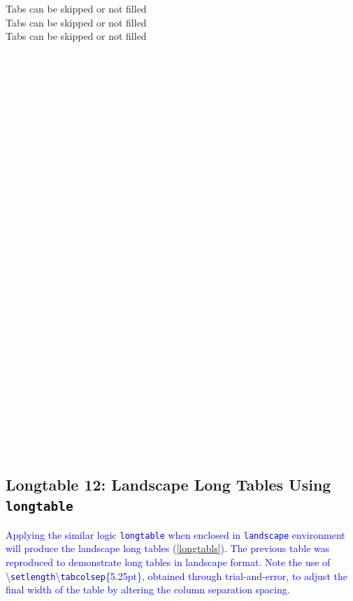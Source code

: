 \documentclass[phd,showframe]{ndsu-thesis-2022}
\newcommand\italk[1]{\textcolor{blue}{#1}}  %
\newcommand\cmd[1]{\textbackslash\texttt{#1}}  %
\begin{document}
\begin{tabbing}
\>Tabs can be skipped or not filled\\ 
\>\>Tabs can be skipped or not filled\\ 
\>\>\>Tabs can be skipped or not filled\\ 
    \\
    \\
    \\
    \\
    \\
    \\
    \\
    \\
    \\
    \\
    \\
    \\
    \\
    \\
    \\
    \\
    \\
    \\
    \\
    \\
    \\
    \\
    \\
    \\
    \\
    \\
    \\
    \\
    \\
    \\
\end{tabbing}
\endgroup

\vspace{-4ex}
\kant[9]


\subsection{Longtable 12: Landscape Long Tables Using \texttt{longtable}}
\italk{Applying the similar logic \texttt{longtable} when enclosed in \texttt{landscape} environment will produce the landscape long tables (\cref{longtabls}). The previous table was reproduced to demonstrate long tables in landscape format. Note the use of \cmd{setlength}\cmd{tabcolsep}\{5.25pt\}, obtained through trial-and-error, to adjust the final width of the table by altering the column separation spacing.}
\end{document}
